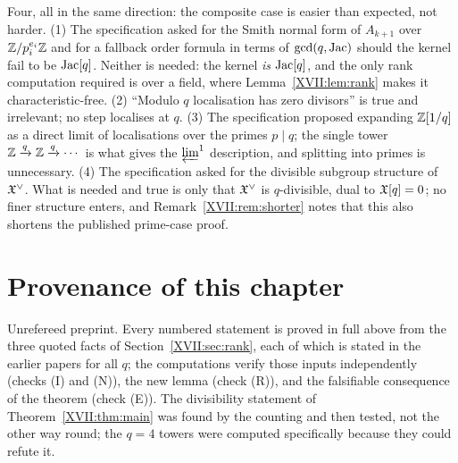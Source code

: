 \begin{remark}\label{XVII:rem:corrections}
Four, all in the same direction: the composite case is easier than expected, not harder.
(1) The specification asked for the Smith normal form of $A_{k+1}$ over
$\mathbb{Z}/p_i^{e_i}\mathbb{Z}$ and for a fallback order formula in terms of $\gcd(q,\operatorname{Jac})$ should the
kernel fail to be $\operatorname{Jac}[q]$. Neither is needed: the kernel \emph{is} $\operatorname{Jac}[q]$, and the
only rank computation required is over a field, where Lemma~\ref{XVII:lem:rank} makes it
characteristic-free. (2) ``Modulo $q$ localisation has zero divisors'' is true and
irrelevant; no step localises at $q$. (3) The specification proposed expanding $\mathbb{Z}[1/q]$
as a direct limit of localisations over the primes $p\mid q$; the single tower
$\mathbb{Z}\xrightarrow{q}\mathbb{Z}\xrightarrow{q}\cdots$ is what gives the $\varprojlim^1$ description,
and splitting into primes is unnecessary. (4) The specification asked for the divisible
subgroup structure of $\mathfrak{X}^\vee$. What is needed and true is only that $\mathfrak{X}^\vee$ is
$q$-divisible, dual to $\mathfrak{X}[q]=0$; no finer structure enters, and
Remark~\ref{XVII:rem:shorter} notes that this also shortens the published prime-case proof.
\end{remark}

\section*{Provenance of this chapter}

Unrefereed preprint. Every numbered statement is proved in full above from the three
quoted facts of Section~\ref{XVII:sec:rank}, each of which is stated in the earlier papers for
all $q$; the computations verify those inputs independently (checks (I) and (N)), the new
lemma (check (R)), and the falsifiable consequence of the theorem (check (E)). The
divisibility statement of Theorem~\ref{XVII:thm:main} was found by the counting and then
tested, not the other way round; the $q=4$ towers were computed specifically because they
could refute it.
